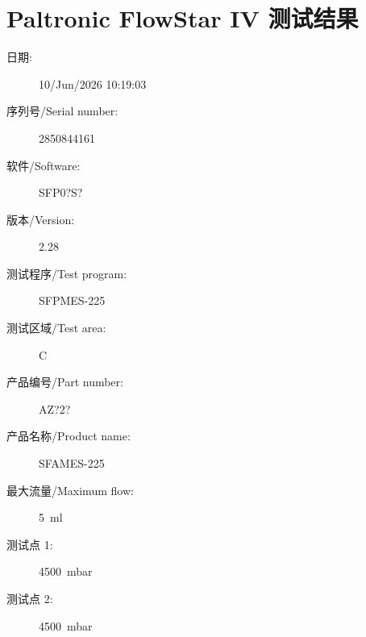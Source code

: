 \documentclass[UTF8,10pt,a4paper,fontset=fandol]{ctexart}
\newcommand{\fieldvalue}[1]{#1}
\begin{document}

\newpage

\section{Paltronic FlowStar IV 测试结果}

\begin{description}
\item[日期:] 
\fieldvalue{10/Jun/2026 10:19:03}

\item[序列号/Serial number:] 
\fieldvalue{2850844161}

\item[软件/Software:] 
\fieldvalue{SFP0?S?}

\item[版本/Version:] 
\fieldvalue{2.28}

\item[测试程序/Test program:] 
\fieldvalue{SFPMES-225}

\item[测试区域/Test area:] 
\fieldvalue{C}

\item[产品编号/Part number:] 
\fieldvalue{AZ?2?}

\item[产品名称/Product name:] 
\fieldvalue{SFAMES-225}

\item[最大流量/Maximum flow:] 
\fieldvalue{5~ml}

\item[测试点 1:] 
\fieldvalue{4500~mbar}

\item[测试点 2:] 
\fieldvalue{4500~mbar}


\end{description}
\end{document}
